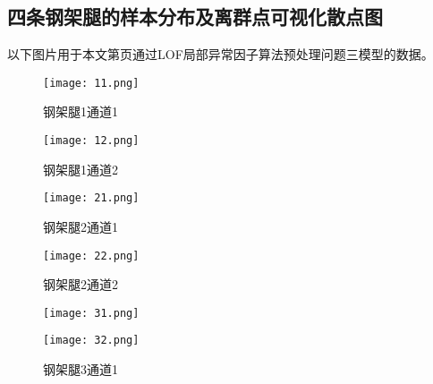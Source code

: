 \documentclass[withoutpreface,bwprint]{cumcmthesis}  %
\begin{document}
\begin{appendices}
		\subsection{四条钢架腿的样本分布及离群点可视化散点图}
            以下图片用于本文第\pageref{model_3}页通过LOF局部异常因子算法预处理问题三模型的数据。  
             \begin{figure}[h!] 
            \begin{minipage}{.48\textwidth} %
                \centering  
                \texttt{[image: 11.png]}  
                \caption{钢架腿1通道1}  
                \label{data_begin}
            \end{minipage}  
            \hfill %
            \begin{minipage}{.48\textwidth} %
                \centering  
                \texttt{[image: 12.png]}  
                \caption{钢架腿1通道2}  
            \end{minipage}  
        \end{figure}
        \begin{figure}[h!] 
            \begin{minipage}{.48\textwidth} %
                \centering  
                \texttt{[image: 21.png]}  
                \caption{钢架腿2通道1}  
            \end{minipage}  
            \hfill %
            \begin{minipage}{.48\textwidth} %
                \centering  
                \texttt{[image: 22.png]}  
                \caption{钢架腿2通道2}  
            \end{minipage}  
        \end{figure}
        \begin{figure}[h!] 
            \begin{minipage}{.48\textwidth} %
                \centering  
                \texttt{[image: 31.png]}  
                \caption{钢架腿3通道1}  
            \end{minipage}  
            \hfill %
            \begin{minipage}{.48\textwidth} %
                \centering  
                \texttt{[image: 32.png]}  

\end{minipage}
\end{figure}
\end{appendices}
\end{document}
